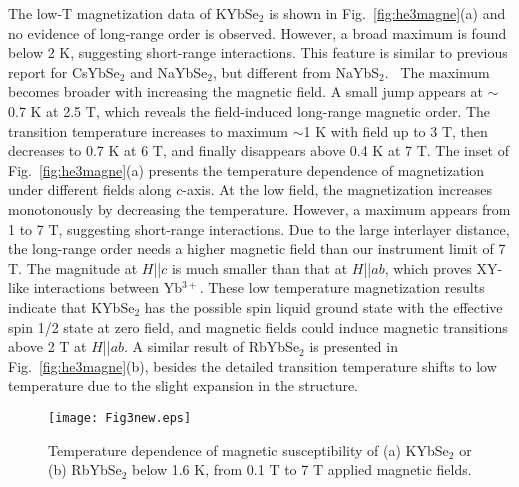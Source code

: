 \documentclass[%
 aip,
 amsmath,amssymb,
 reprint,%
]{revtex4-1}
\begin{document}
The low-T magnetization data of KYbSe$_2$ is shown in Fig.~\ref{fig:he3magne}(a) and no evidence of long-range order is observed. However, a broad maximum is found below 2 K, suggesting short-range interactions. This feature is similar to previous report for CsYbSe$_2$ and NaYbSe$_2$, but different from NaYbS$_2$.~\cite{ranjith2019field,Ranjith2019naybse,PhysRevB.100.220407} The maximum becomes broader with increasing the magnetic field. A small jump appears at $\sim$0.7 K at 2.5 T, which reveals the field-induced long-range magnetic order. The transition temperature increases to maximum $\sim$1 K with field up to 3 T, then decreases to 0.7 K at 6 T, and finally disappears above 0.4 K at 7 T. The inset of Fig.~\ref{fig:he3magne}(a) presents the temperature dependence of magnetization under different fields along $c$-axis. At the low field, the magnetization increases monotonously by decreasing the temperature. However, a maximum appears from 1 to 7 T, suggesting short-range interactions. Due to the large interlayer distance, the long-range order needs a higher magnetic field than our instrument limit of 7 T. The magnitude at $H$||$c$ is much smaller than that at $H$||$ab$, which proves XY-like interactions between Yb$^{3+}$. These low temperature magnetization results indicate that KYbSe$_2$ has the possible spin liquid ground state with the effective spin 1/2 state at zero field, and magnetic fields could induce magnetic transitions above 2 T at $H$||$ab$. A similar result of RbYbSe$_2$ is presented in Fig.~\ref{fig:he3magne}(b), besides the detailed transition temperature shifts to low temperature due to the slight expansion in the structure. 

\begin{figure}[tbh]
\texttt{[image: Fig3new.eps]}
\caption {\label{fig:magnetization}Temperature dependence of magnetic susceptibility of (a) KYbSe$_2$ or (b) RbYbSe$_2$ below 1.6 K, from 0.1 T to 7 T applied magnetic fields. }
\label{crystal}
\end{figure}
\end{document}
